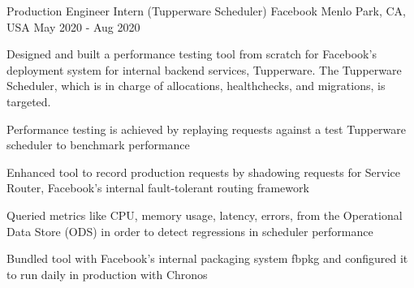 

\begin{cventries}


  \cventry
  {Production Engineer Intern (Tupperware Scheduler)} %
    {Facebook} %
    {Menlo Park, CA, USA} %
    {May 2020 - Aug 2020} %
    {
      \begin{cvitems} 
	      \item {Designed and built a performance testing tool from scratch for Facebook's deployment system for internal backend services, Tupperware. The Tupperware Scheduler, which is in charge of allocations, healthchecks, and migrations, is targeted.}
	      \item {Performance testing is achieved by replaying requests against a test Tupperware scheduler to benchmark performance}
	      \item {Enhanced tool to record production requests by shadowing requests for Service Router, Facebook's internal fault-tolerant routing framework}
	      \item {Queried metrics like CPU, memory usage, latency, errors, from the Operational Data Store (ODS) in order to detect regressions in scheduler performance}
	      \item {Bundled tool with Facebook's internal packaging system fbpkg and configured it to run daily in production with Chronos}
      \end{cvitems}
    }


\end{cventries}
